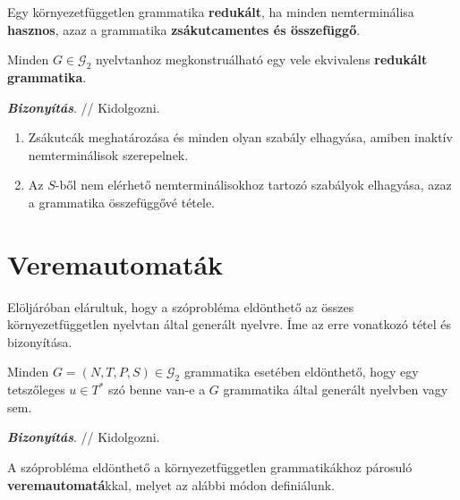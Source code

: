 \begin{tcolorbox}
	\begin{definition}	
		Egy környezetfüggetlen grammatika
		\textbf{redukált}, ha minden nemterminálisa \textbf{hasznos}, azaz
		a grammatika \textbf{zsákutcamentes és összefüggő}.
	\end{definition}
\end{tcolorbox}

\begin{tcolorbox}
	\begin{theorem}
		Minden $G \in \mathcal{G}_2$ nyelvtanhoz
		megkonstruálható egy vele ekvivalens \textbf{redukált grammatika}.
	\end{theorem}
\end{tcolorbox}

\textbf{\textit{Bizonyítás}}. // Kidolgozni.

\begin{enumerate}
	\item Zsákutcák meghatározása és minden olyan szabály
	elhagyása, amiben inaktív nemterminálisok szerepelnek.
	\item Az $S$-ből nem elérhető nemterminálisokhoz tartozó
	szabályok elhagyása, azaz a grammatika összefüggővé
	tétele.
\end{enumerate}

\section{Veremautomaták}

Elöljáróban elárultuk, hogy a szóprobléma eldönthető az összes környezetfüggetlen nyelvtan által generált nyelvre. Íme az erre vonatkozó tétel és bizonyítása.

\begin{tcolorbox}
	\begin{theorem}
		Minden $G=(N,T,P,S)\in \mathcal{G}_2$ grammatika esetében eldönthető, hogy
		egy tetszőleges $u \in T^*$ szó benne van-e a $G$
		grammatika által generált nyelvben vagy sem.
	\end{theorem}
\end{tcolorbox}

\textbf{\textit{Bizonyítás}}. // Kidolgozni.

A szóprobléma eldönthető a környezetfüggetlen grammatikákhoz párosuló \textbf{veremautomatá}kkal, melyet az alábbi módon definiálunk.

